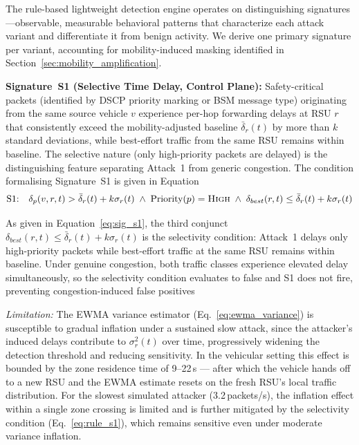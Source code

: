 \documentclass[12pt, a4paper]{report}
\begin{document}
The rule-based lightweight detection engine operates on distinguishing
signatures---observable, measurable behavioral patterns that characterize
each attack variant and differentiate it from benign activity. We derive
one primary signature per variant, accounting for mobility-induced
masking identified in Section~\ref{sec:mobility_amplification}.

\textbf{Signature~S1 (Selective Time Delay, Control Plane):}
Safety-critical packets (identified by DSCP priority marking or BSM
message type) originating from the same source vehicle $v$ experience
per-hop forwarding delays at RSU $r$ that consistently exceed the
mobility-adjusted baseline $\bar{\delta}_r(t)$ by more than $k$
standard deviations, while best-effort traffic from the same RSU
remains within baseline. The selective nature (only high-priority
packets are delayed) is the distinguishing feature separating Attack~1
from generic congestion.
The condition formalising Signature~S1 is given in
Equation
\begin{equation}
\text{S1:}\quad
\delta_p(v,r,t) > \bar{\delta}_r(t) + k\sigma_r(t)
\;\land\;
\text{Priority}(p) = \textsc{High}
\;\land\;
\delta_{best}(r,t) \leq \bar{\delta}_r(t) + k\sigma_r(t)
\label{eq:sig_s1}
\end{equation}


As given in Equation~\eqref{eq:sig_s1}, the third
conjunct $\delta_{best}(r,t)\leq\bar{\delta}_r(t)+k\sigma_r(t)$
is the selectivity condition: Attack~1 delays only
high-priority packets while best-effort traffic at
the same \ac{RSU} remains within baseline. Under
genuine congestion, both traffic classes experience
elevated delay simultaneously, so the selectivity
condition evaluates to false and S1 does not fire,
preventing congestion-induced false positives

\textit{Limitation:} The \ac{EWMA} variance estimator
(Eq.~\ref{eq:ewma_variance}) is susceptible to gradual
inflation under a sustained slow attack, since the
attacker's induced delays contribute to $\sigma_r^2(t)$
over time, progressively widening the detection
threshold and reducing sensitivity. In the vehicular
setting this effect is bounded by the zone residence
time of 9--22\,s --- after which the vehicle hands
off to a new \ac{RSU} and the \ac{EWMA} estimate
resets on the fresh \ac{RSU}'s local traffic
distribution. For the slowest simulated attacker
(3.2\,packets/s), the inflation effect within a single
zone crossing is limited and is further mitigated by
the selectivity condition (Eq.~\ref{eq:rule_s1}),
which remains sensitive even under moderate variance
inflation.
\end{document}
